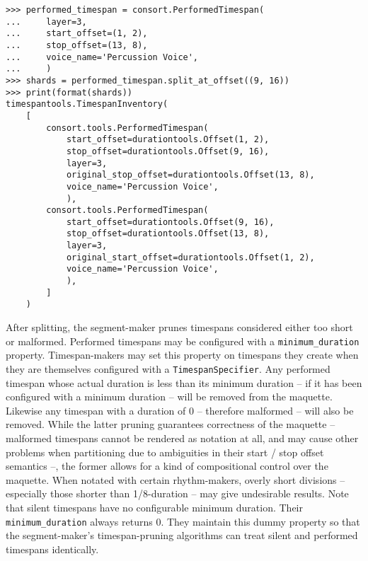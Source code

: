 \begin{abjadbookoutput}
\begin{singlespacing}
\vspace{-0.5\baselineskip}
\begin{lstlisting}
>>> performed_timespan = consort.PerformedTimespan(
...     layer=3,
...     start_offset=(1, 2),
...     stop_offset=(13, 8),
...     voice_name='Percussion Voice',
...     )
>>> shards = performed_timespan.split_at_offset((9, 16))
>>> print(format(shards))
timespantools.TimespanInventory(
    [
        consort.tools.PerformedTimespan(
            start_offset=durationtools.Offset(1, 2),
            stop_offset=durationtools.Offset(9, 16),
            layer=3,
            original_stop_offset=durationtools.Offset(13, 8),
            voice_name='Percussion Voice',
            ),
        consort.tools.PerformedTimespan(
            start_offset=durationtools.Offset(9, 16),
            stop_offset=durationtools.Offset(13, 8),
            layer=3,
            original_start_offset=durationtools.Offset(1, 2),
            voice_name='Percussion Voice',
            ),
        ]
    )
\end{lstlisting}
\end{singlespacing}
\end{abjadbookoutput}

\noindent After splitting, the segment-maker prunes timespans considered either
too short or malformed. Performed timespans may be configured with a
\texttt{minimum\_duration} property. Timespan-makers may set this property on
timespans they create when they are themselves configured with a
\texttt{TimespanSpecifier}. Any performed timespan whose actual duration is
less than its minimum duration -- if it has been configured with a minimum
duration -- will be removed from the maquette. Likewise any timespan with a
duration of 0 -- therefore malformed -- will also be removed. While the latter
pruning guarantees correctness of the maquette -- malformed timespans cannot be
rendered as notation at all, and may cause other problems when partitioning due
to ambiguities in their start / stop offset semantics --, the former allows for
a kind of compositional control over the maquette. When notated with certain
rhythm-makers, overly short divisions -- especially those shorter than
1/8-duration -- may give undesirable results. Note that silent timespans have
no configurable minimum duration. Their \texttt{minimum\_duration} always
returns 0. They maintain this dummy property so that the segment-maker's
timespan-pruning algorithms can treat silent and performed timespans
identically.

